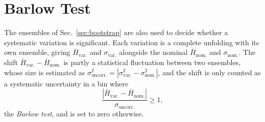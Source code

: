 \section{Barlow Test}
\label{sec:barlow}
The ensembles of Sec.~\ref{sec:bootstrap} are also used to decide whether a systematic variation is significant. 
%
Each variation is a complete unfolding with its own ensemble, giving \(\bar{H}_\mathrm{var.}\) and \(\sigma_\mathrm{var.}\) alongside the nominal \(\bar{H}_\mathrm{nom.}\) and \(\sigma_\mathrm{nom.}\). 
%
The shift \(\bar{H}_\mathrm{var.} - \bar{H}_\mathrm{nom.}\) is partly a statistical fluctuation between two ensembles, whose size is estimated as \(\sigma^2_\mathrm{uncorr.} = |\sigma^2_\mathrm{var.} - \sigma^2_\mathrm{nom.}|\), and the shift is only counted as a systematic uncertainty in a bin where
\begin{equation}
	\label{eq:barlow}
	\frac{|\bar{H}_\mathrm{var.} - \bar{H}_\mathrm{nom.}|}{\sigma_\mathrm{uncorr.}} \geq 1 ,
\end{equation}
the \emph{Barlow test}, and is set to zero otherwise. 






